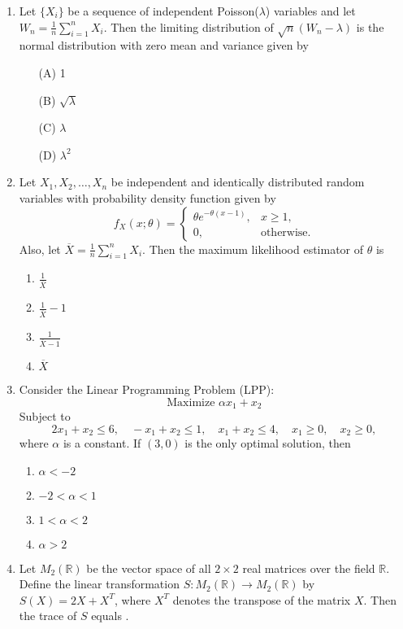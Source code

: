 \documentclass[journal]{IEEEtran}
\begin{document}
\begin{enumerate}
\item Let \( \{X_i\} \) be a sequence of independent Poisson(\(\lambda\)) variables and let \( W_n = \frac{1}{n} \sum_{i=1}^n X_i \). Then the limiting distribution of \( \sqrt{n}(W_n - \lambda) \) is the normal distribution with zero mean and variance given by
\begin{multicols}{2}
\begin{enumerate}
    \item[(A)] 1
    \item[(B)] \(\sqrt{\lambda}\)
    \item[(C)] \(\lambda\)
    \item[(D)] \(\lambda^2\)
\end{enumerate}
\end{multicols}
\vspace{0.5cm}
\item Let $X_1, X_2, \dots, X_n$ be independent and identically distributed random variables with probability density function given by
\[
f_X(x; \theta) = 
\begin{cases}
\theta e^{-\theta (x - 1)}, & x \geq 1, \\
0, & \text{otherwise}.
\end{cases}
\]
Also, let $\overline{X} = \frac{1}{n} \sum_{i=1}^n X_i$. Then the maximum likelihood estimator of $\theta$ is
\begin{multicols}{2}
    \begin{enumerate}
        \item $\frac{1}{\overline{X}}$
        \item $\frac{1}{\overline{X}}-1$
        \item $\frac{1}{\overline{X}-1}$
        \item $\overline{X}$
    \end{enumerate}
\end{multicols}
\vspace{0.5cm}
\item Consider the Linear Programming Problem (LPP):  
\[
\text{Maximize } \alpha x_1 + x_2
\]
Subject to  
\[
2x_1 + x_2 \leq 6, \quad -x_1 + x_2 \leq 1, \quad x_1 + x_2 \leq 4, \quad x_1 \geq 0, \quad x_2 \geq 0,
\]
where $\alpha$ is a constant. If $(3, 0)$ is the only optimal solution, then
\begin{multicols}{2}
    \begin{enumerate}
        \item $\alpha<-2$
        \item $-2<\alpha<1$
        \item $1<\alpha<2$
        \item $\alpha>2$
    \end{enumerate}
\end{multicols}
\item Let $M_2(\mathbb{R})$ be the vector space of all $2 \times 2$ real matrices over the field $\mathbb{R}$. Define the linear transformation $S : M_2(\mathbb{R}) \to M_2(\mathbb{R})$ by $S(X) = 2X + X^T$, where $X^T$ denotes the transpose of the matrix $X$. Then the trace of $S$ equals \underline{\hspace{2cm}}.


\end{enumerate}
\end{document}
